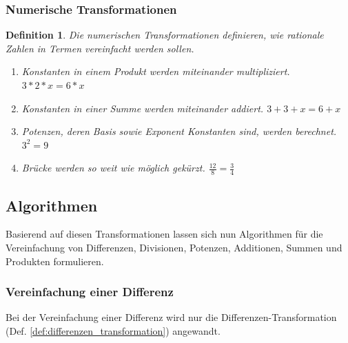 \documentclass[11pt]{article}
\newtheorem{defin}{Definition}
\newcommand{\lab}[1]{(Def. \ref{#1})}
\begin{document}
\subsubsection{Numerische Transformationen}
\begin{defin}
  \label{def:numerische_transformation}
  Die numerischen Transformationen definieren, wie rationale Zahlen in Termen vereinfacht werden sollen.

  \begin{enumerate}
    \item Konstanten in einem Produkt werden miteinander multipliziert. $3*2*x = 6*x$
    \item Konstanten in einer Summe werden miteinander addiert. $3+3+x = 6+x$
    \item Potenzen, deren Basis sowie Exponent Konstanten sind, werden berechnet. $3^2 = 9$
    \item Brücke werden so weit wie möglich gekürzt. $\frac{12}{8} = \frac{3}{4}$
  \end{enumerate}
\end{defin}


\subsection{Algorithmen}

Basierend auf diesen Transformationen lassen sich nun Algorithmen für die Vereinfachung von
Differenzen, Divisionen, Potenzen, Additionen, Summen und Produkten formulieren.

\subsubsection{Vereinfachung einer Differenz}
Bei der Vereinfachung einer Differenz wird nur die Differenzen-Transformation \lab{def:differenzen_transformation}
angewandt.
\end{document}
